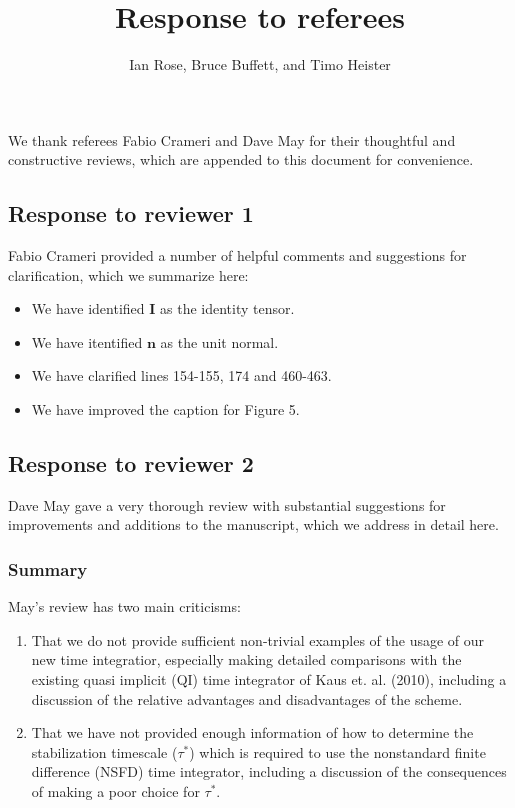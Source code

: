 \documentclass[a4paper,12pt]{article}
\title{Response to referees}
\author{Ian Rose, Bruce Buffett, and Timo Heister}
\date{}
\begin{document}
\maketitle

We thank referees Fabio Crameri and Dave May for their thoughtful and constructive reviews,
which are appended to this document for convenience.

\subsection*{Response to reviewer 1}

Fabio Crameri provided a number of helpful comments and suggestions for clarification,
which we summarize here:

\begin{itemize}
  \item We have identified $\mathbf{I}$ as the identity tensor.
  \item We have itentified $\mathbf{n}$ as the unit normal.
  \item We have clarified lines 154-155, 174 and 460-463.
  \item We have improved the caption for Figure 5.
\end{itemize}


\subsection*{Response to reviewer 2}

Dave May gave a very thorough review with substantial suggestions for 
improvements and additions to the manuscript, which we address in detail here.

\subsubsection*{Summary}

May's review has two main criticisms:
\begin{enumerate}
\item That we do not provide sufficient non-trivial examples of the usage of our new 
  time integratior, especially making detailed comparisons with the existing quasi implicit (QI)
  time integrator of Kaus et. al. (2010), including a discussion of the relative advantages
  and disadvantages of the scheme.
\item That we have not provided enough information of how to determine the stabilization timescale ($\tau^*$)
  which is required to use the nonstandard finite difference (NSFD) time integrator, including
  a discussion of the consequences of making a poor choice for $\tau^*$.
\end{enumerate}
\end{document}
